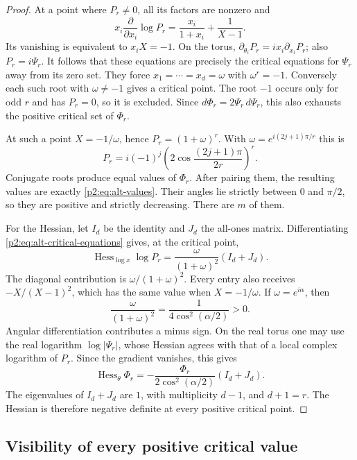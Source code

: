 \documentclass[11pt,a4paper]{article}
\theoremstyle{definition}
\theoremstyle{remark}
\numberwithin{equation}{section}
\begin{document}
\begin{proof}
At a point where $P_r\ne0$, all its factors are nonzero and
\begin{equation}\label{p2:eq:alt-critical-equations}
 x_i\frac{\partial}{\partial x_i}\log P_r
 =\frac{x_i}{1+x_i}+\frac1{X-1}.
\end{equation}
Its vanishing is equivalent to $x_iX=-1$. On the torus,
$\partial_{\theta_i}P_r=i x_i\partial_{x_i}P_r$; also $P_r=i\Psi_r$.
It follows that these equations are precisely the critical equations
for $\Psi_r$ away from its zero set. They force
$x_1=\cdots=x_d=\omega$ with $\omega^r=-1$. Conversely each such root
with $\omega\ne-1$ gives a critical point. The root $-1$ occurs only
for odd $r$ and has $P_r=0$, so it is excluded. Since
$d\Phi_r=2\Psi_r\,d\Psi_r$, this also exhausts the positive critical
set of $\Phi_r$.

At such a point $X=-1/\omega$, hence
$P_r=(1+\omega)^r$. With $\omega=e^{i(2j+1)\pi/r}$ this is
\[
 P_r=i(-1)^j
       \left(2\cos\frac{(2j+1)\pi}{2r}\right)^r.
\]
Conjugate roots produce equal values of $\Phi_r$. After pairing them,
the resulting values are exactly \eqref{p2:eq:alt-values}. Their angles
lie strictly between $0$ and $\pi/2$, so they are positive and strictly
decreasing. There are $m$ of them.

For the Hessian, let $I_d$ be the identity and $J_d$ the all-ones matrix.
Differentiating \eqref{p2:eq:alt-critical-equations} gives, at the critical
point,
\[
 \operatorname{Hess}_{\log x}\log P_r
 =\frac{\omega}{(1+\omega)^2}(I_d+J_d).
\]
The diagonal contribution is $\omega/(1+\omega)^2$. Every entry also
receives $-X/(X-1)^2$, which has the same value when $X=-1/\omega$.
If $\omega=e^{i\alpha}$, then
\[
 \frac{\omega}{(1+\omega)^2}
 =\frac1{4\cos^2(\alpha/2)}>0.
\]
Angular differentiation contributes a minus sign. On the real torus
one may use the real logarithm $\log|\Psi_r|$, whose Hessian agrees
with that of a local complex logarithm of $P_r$. Since the gradient
vanishes, this gives
\begin{equation}\label{p2:eq:alt-hessian}
 \operatorname{Hess}_{\theta}\Phi_r
 =-\frac{\Phi_r}{2\cos^2(\alpha/2)}(I_d+J_d).
\end{equation}
The eigenvalues of $I_d+J_d$ are $1$, with multiplicity $d-1$, and
$d+1=r$. The Hessian is therefore negative definite at every positive
critical point.
\end{proof}

\subsection{Visibility of every positive critical value}
\end{document}
